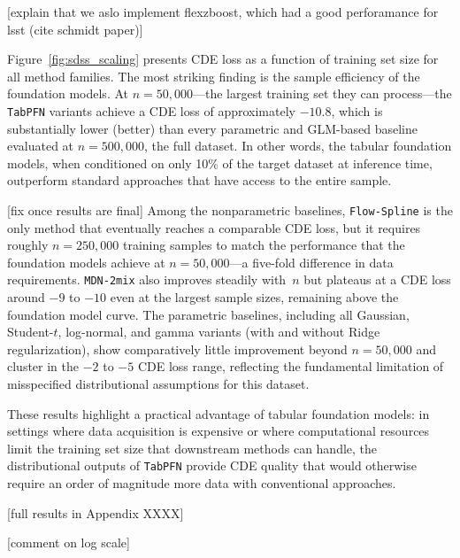 \documentclass{article}
\newcommand{\method}[1]{\texttt{#1}}
\begin{document}
[explain that we aslo implement flexzboost, which had a good perforamance for lsst (cite schmidt paper)]
 

Figure~\ref{fig:sdss_scaling} presents CDE loss as a function of
training set size for all method families.
The most striking finding is the sample efficiency of the foundation
models.
At $n = 50{,}000$---the largest training set they can process---the
\method{TabPFN} variants achieve a CDE loss of approximately $-10.8$,
which is substantially lower (better) than every parametric and
GLM-based baseline evaluated at $n = 500{,}000$, the full dataset.
In other words, the tabular foundation models, when conditioned on only 10\% of the target dataset at inference time, outperform standard approaches that have access to the entire sample.

 [fix once results are final]
Among the nonparametric baselines, \method{Flow-Spline} is the
only method that eventually reaches a comparable CDE loss, but it
requires roughly $n = 250{,}000$ training samples to match the
performance that the foundation models achieve at $n = 50{,}000$---a
five-fold difference in data requirements.
\method{MDN-2mix} also improves steadily with~$n$ but plateaus at a
CDE loss around $-9$ to $-10$ even at the largest sample sizes,
remaining above the foundation model curve.
The parametric baselines, including all Gaussian, Student-$t$,
log-normal, and gamma variants (with and without Ridge regularization),
show comparatively little improvement beyond $n = 50{,}000$ and
cluster in the $-2$ to $-5$ CDE loss range, reflecting the
fundamental limitation of misspecified distributional assumptions for
this dataset.
 
These results highlight a practical advantage of tabular foundation
models: in settings where data acquisition is expensive or where
computational resources limit the training set size that downstream
methods can handle, the distributional outputs of \method{TabPFN}
provide CDE quality that would otherwise require an order of magnitude
more data with conventional approaches.

[full results in Appendix XXXX]

 [comment on log scale]
\end{document}
